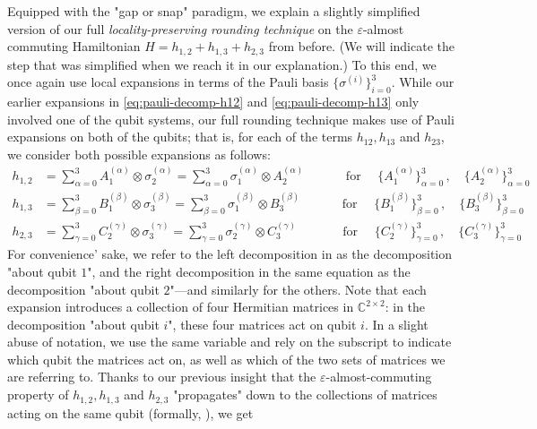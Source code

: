 \documentclass[a4paper,onecolumn,11pt]{quantumarticle}
\theoremstyle{plain}
\newcommand{\eps}{\varepsilon}
\begin{document}
Equipped with the "gap or snap" paradigm, we explain a slightly simplified version of our full \emph{locality-preserving rounding technique} on the $\eps$-almost commuting Hamiltonian $H = h_{1,2} + h_{1,3} + h_{2,3}$ from before. (We will indicate the step that was simplified when we reach it in our explanation.) 
To this end, we once again use local expansions in terms of the Pauli basis $\{\sigma^{(i)}\}_{i=0}^3$. While our earlier expansions in \eqref{eq:pauli-decomp-h12} and \eqref{eq:pauli-decomp-h13} only involved one of the qubit systems, our full rounding technique makes use of Pauli expansions on both of the qubits; that is, for each of the terms $h_{12}, h_{13}$ and $h_{23}$, we consider both possible expansions as follows:
\begin{align}
h_{1,2} &= \sum_{\alpha=0}^3 A^{(\alpha)}_1 \otimes \sigma_2^{(\alpha)} = \sum_{\alpha=0}^3 \sigma^{(\alpha)}_1 \otimes A_2^{(\alpha)}  \quad\quad\quad \text { for } \quad \{A_1^{(\alpha)}\}_{\alpha=0}^3\, , \quad \{A_2^{(\alpha)}\}_{\alpha=0}^3\quad\label{eq:pauli-decomp-h12-full}\\
h_{1,3} &= \sum_{\beta=0}^3 B^{(\beta)}_1 \otimes \sigma_3^{(\beta)} = \sum_{\beta=0}^3 \sigma^{(\beta)}_1 \otimes B_3^{(\beta)}   \quad\quad\quad \text { for } \quad \{B_1^{(\beta)}\}_{\beta=0}^3\, , \quad \{B_3^{(\beta)}\}_{\beta=0}^3\quad\label{eq:pauli-decomp-h13-full} 
\\h_{2,3} &= \sum_{\gamma=0}^3 C^{(\gamma)}_2 \otimes \sigma_3^{(\gamma)} = \sum_{\gamma=0}^3 \sigma^{(\gamma)}_2 \otimes C_3^{(\gamma)}   \quad\quad\,
\,\,\,\,\,\,\,\text { for } \quad \{C_2^{(\gamma)}\}_{\gamma=0}^3\, , \quad \{C_3^{(\gamma)}\}_{\gamma=0}^3 \quad\label{eq:pauli-decomp-h23-full}
\end{align}
For convenience' sake, we refer to the left decomposition in  as the decomposition "about qubit $1$", and the right decomposition in the same equation as the decomposition "about qubit $2$"---and similarly for the others. Note that each expansion introduces a collection of four Hermitian matrices in $\mathbb{C}^{2 \times 2}$: in the decomposition "about qubit $i$", these four matrices act on qubit $i$. In a slight abuse of notation, we use the same variable and rely on the subscript to indicate which qubit the matrices act on, as well as which of the two sets of matrices we are referring to. Thanks to our previous insight that the $\eps$-almost-commuting property of $h_{1,2}, h_{1,3}$ and $h_{2,3}$ "propagates" down to the collections of matrices acting on the same qubit (formally, ), we get
\end{document}
